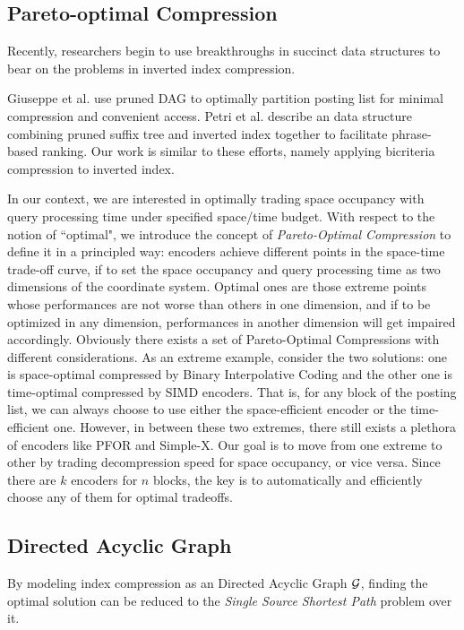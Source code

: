\documentclass{sig-alternate-05-2015}
\begin{document}
\subsection{Pareto-optimal Compression}
Recently, researchers begin to use breakthroughs in succinct data structures to bear on the problems in inverted index compression.

Giuseppe et al. \cite{ottaviano2014partitioned} use pruned DAG \cite{ferragina2011optimally} to optimally partition posting list for minimal compression and convenient access.
Petri et al. \cite{petri2014score} describe an data structure combining pruned suffix tree and inverted index together to facilitate phrase-based ranking.
Our work is similar to these efforts, namely applying bicriteria compression to inverted index.

In our context, we are interested in optimally trading space occupancy with query processing time under specified space/time budget.
With respect to the notion of ``optimal", we introduce the concept of \textit{Pareto-Optimal Compression} to define it in a principled way: encoders achieve different points in the space-time trade-off curve, if to set the space occupancy and query processing time as two dimensions of the coordinate system.
Optimal ones are those extreme points whose performances are not worse than others in one dimension, and if to be optimized in any dimension, performances in another dimension will get impaired accordingly.
Obviously there exists a set of Pareto-Optimal Compressions with different considerations.
As an extreme example, consider the two solutions: one is space-optimal compressed by Binary Interpolative Coding \cite{moffat2000binary} and the other one is time-optimal compressed by SIMD encoders.
That is, for any block of the posting list, we can always choose to use either the space-efficient encoder or the time-efficient one.
However, in between these two extremes, there still exists a plethora of encoders like PFOR and Simple-X.
Our goal is to move from one extreme to other by trading decompression speed for space occupancy, or vice versa.
Since there are $ k $ encoders for $ n $ blocks, the key is to automatically and efficiently choose any of them for optimal tradeoffs.

\subsection{Directed Acyclic Graph}
By modeling index compression as an Directed Acyclic Graph $ \cal G $, finding the optimal solution can be reduced to the \textit{Single Source Shortest Path} problem over it.
\end{document}
